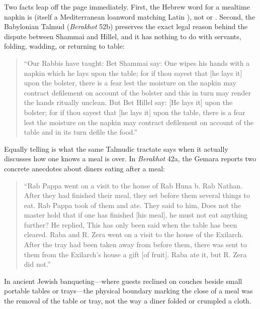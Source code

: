 Two facts leap off the page immediately. First, the Hebrew word for a mealtime napkin is  (itself a Mediterranean loanword matching Latin ), not  or . Second, the Babylonian Talmud (\emph{Berakhot} 52b) preserves the exact legal reason behind the dispute between Shammai and Hillel, and it has nothing to do with servants, folding, wadding, or returning to table:
\begin{quote}
``Our Rabbis have taught: Bet Shammai say: One wipes his hands with a napkin which he lays upon the table; for if thou sayest that [he lays it] upon the bolster, there is a fear lest the moisture on the napkin may contract defilement on account of the bolster and this in turn may render the hands ritually unclean. But Bet Hillel say: [He lays it] upon the bolster; for if thou sayest that [he lays it] upon the table, there is a fear lest the moisture on the napkin may contract defilement on account of the table and in its turn defile the food.''
\end{quote}

Equally telling is what the same Talmudic tractate says when it actually discusses how one knows a meal is over. In \emph{Berakhot} 42a, the Gemara reports two concrete anecdotes about diners eating after a meal:
\begin{quote}
``Rab Pappa went on a visit to the house of Rab Huna b. Rab Nathan. After they had finished their meal, they set before them several things to eat. Rab Pappa took of them and ate. They said to him, Does not the master hold that if one has finished [his meal], he must not eat anything further? He replied, This has only been said when the table has been cleared. Raba and R. Zera went on a visit to the house of the Exilarch. After the tray had been taken away from before them, there was sent to them from the Exilarch's house a gift [of fruit]. Raba ate it, but R. Zera did not.''
\end{quote}
In ancient Jewish banqueting---where guests reclined on couches beside small portable tables or trays---the physical boundary marking the close of a meal was the removal of the table or tray, not the way a diner folded or crumpled a cloth.

